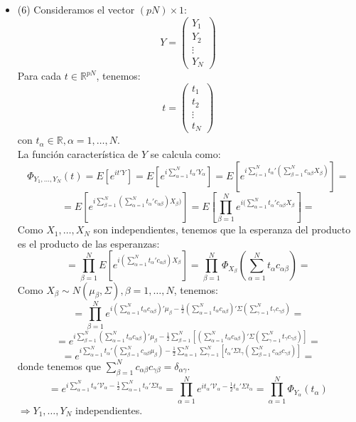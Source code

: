 \documentclass[11pt,a4paper]{article}
\begin{document}
\begin{itemize}
\item (6) Consideramos el vector $(pN) \times 1$:
$$Y = \begin{pmatrix} Y_{1} \\ Y_{2} \\ \vdots \\ Y_{N} \end{pmatrix}$$
Para cada $t \in \mathbb{R}^{pN}$, tenemos:
$$t = \begin{pmatrix} t_{1} \\ t_{2} \\ \vdots \\ t_{N} \end{pmatrix}$$
con $t_{\alpha} \in \mathbb{R}, \alpha = 1, \dots, N$. \\
La función característica de $Y$ se calcula como:
$$\Phi_{Y_{1}, \dots, Y_{N}}(t) = E[e^{it'Y}] = E[e^{i\sum_{\alpha=1}^{N}t_{\alpha}'Y_{\alpha}}] = E[e^{i\sum_{i=1}^{N}t_{\alpha}'(\sum_{\beta=1}^{N} c_{\alpha\beta}X_{\beta})}] =$$
$$= E[e^{i\sum_{\beta=1}^{N} (\sum_{\alpha=1}^{N} t_{\alpha}'c_{\alpha\beta})X_{\beta})}] = E[\prod_{\beta=1}^{N} e^{i(\sum_{\alpha=1}^{N}t_{\alpha}'c_{\alpha\beta}X_{\beta}}] =$$
Como $X_{1}, \dots, X_{N}$ son independientes, tenemos que la esperanza del producto es el producto de las esperanzas:
$$= \prod_{\beta=1}^{N} E[e^{i(\sum_{\alpha=1}^{N} t_{\alpha}'c_{\alpha\beta})X_{\beta}}] = \prod_{\beta=1}^{N} \Phi_{X_{\beta}}(\sum_{\alpha=1}^{N}t_{\alpha}c_{\alpha\beta}) =$$
Como $X_{\beta} \sim N(\mu_{\beta}, \Sigma), \beta = 1, \dots, N$, tenemos:
$$= \prod_{\beta=1}^{N} e^{i(\sum_{\alpha=1}^{N} t_{\alpha}c_{\alpha\beta})'\mu_{\beta} - \frac{1}{2}(\sum_{\alpha=1}^{N} t_{\alpha}c_{\alpha\beta})'\Sigma(\sum_{\gamma=1}^{N} t_{\gamma}c_{\gamma\beta})} =$$
$$= e^{i\sum_{\beta=1}^{N}(\sum_{\alpha=1}^{N} t_{\alpha}c_{\alpha\beta})'\mu_{\beta} - \frac{1}{2} \sum_{\beta=1}^{N}[(\sum_{\alpha=1}^{N} t_{\alpha}c_{\alpha\beta})' \Sigma (\sum_{\gamma=1}^{N} t_{\gamma}c_{\gamma\beta})]} =$$
$$= e^{i\sum_{\alpha=1}^{N} t_{\alpha}' (\sum_{\beta=1}^{N} c_{\alpha\beta}\mu_{\beta}) - \frac{1}{2} \sum_{\alpha=1}^{N} \sum_{\gamma=1}^{N}[t_{\alpha}' \Sigma t_{\gamma} (\sum_{\beta=1}^{N}c_{\alpha\beta}c_{\gamma\beta})]} =$$
donde tenemos que $\sum_{\beta=1}^{N}c_{\alpha\beta}c_{\gamma\beta} = \delta_{\alpha\gamma}$.
$$= e^{i\sum_{\alpha=1}^{N} t_{\alpha}'\mathcal{V}_{\alpha} - \frac{1}{2} \sum_{\alpha=1}^{N} t_{\alpha}' \Sigma t_{\alpha}} = \prod_{\alpha=1}^{N}e^{it_{\alpha}'\mathcal{V}_{\alpha} - \frac{1}{2}t_{\alpha}' \Sigma t_{\alpha}} = \prod_{\alpha=1}^{N} \Phi_{Y_{\alpha}}(t_{\alpha})$$
$\Rightarrow Y_{1}, \dots, Y_{N}$ independientes.


\end{itemize}
\end{document}
